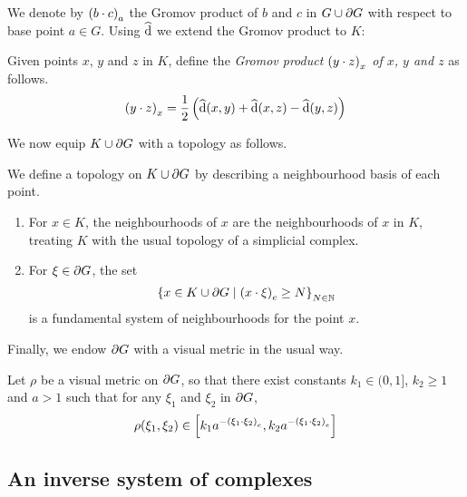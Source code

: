 \documentclass[a4paper]{article}
\begin{document}
We denote by $\gromov{a}{b}{c}$ the Gromov product of $b$ and $c$ in $G \union
\boundary G$ with respect to base point $a \in G$. Using $\newdist$ we extend
the Gromov product to $K$:

\begin{definition}
  Given points $x$, $y$ and $z$ in $K$, define the \emph{Gromov product
  $\gromov{x}{y}{z}$ of $x$, $y$ and $z$} as follows.
  \begin{equation*}
    \gromov{x}{y}{z} = \frac{1}{2}\left(\newdist(x,y) + \newdist(x,z) -
          \newdist(y,z)\right)
  \end{equation*}
\end{definition}

We now equip $K \union \boundary G$ with a topology as follows.

\begin{definition}
  We define a topology on $K \union \boundary G$ by describing a neighbourhood
  basis of each point.
  \begin{enumerate}
    \item For $x \in K$, the neighbourhoods of $x$ are the neighbourhoods of
      $x$ in $K$, treating $K$ with the usual topology of a simplicial complex.
    \item For $\xi \in \boundary G$, the set
      \begin{equation*}
        \set{x \in K \union \boundary G 
              \suchthat \gromov{e}{x}{\xi} \geq N}_{N\in\naturals}
      \end{equation*}
      is a fundamental system of neighbourhoods for the point $x$.
  \end{enumerate}
\end{definition}

Finally, we endow $\boundary G$ with a visual metric in the usual way.

\begin{definition}
  Let $\rho$ be a visual metric on $\boundary G$, so that there exist constants
  $k_1 \in (0,1]$, $k_2 \geq 1$ and $a > 1$ such that for any $\xi_1$ and
  $\xi_2$ in $\boundary G$,
  \begin{equation*}
    \rho(\xi_1, \xi_2) \in \left[k_1 a^{-\gromov{e}{\xi_1}{\xi_2}}, k_2 a^{-\gromov{e}{\xi_1}{\xi_2}}\right]
  \end{equation*}
\end{definition}

\subsection{An inverse system of complexes}
\end{document}
